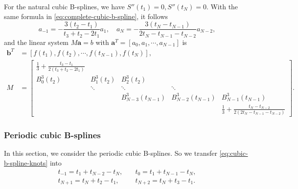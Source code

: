 \documentclass[a4paper]{article}
\theoremstyle{definition}
\begin{document}
For the natural cubic B-splines, we have $S''(t_1) = 0, S''(t_N) = 0$. With the same formula in \cref{eq:complete-cubic-b-spline}, it follows 
\begin{equation}
  a_{-1} = -\frac{3(t_2 - t_1)}{t_3 + t_2 - 2t_1} a_1,\quad a_N = -\frac{3(t_N - t_{N - 1})}{2t_N - t_{N - 1} - t_{N - 2}}a_{N - 2},
  \label{eq:natural-cubic-b-spline-coefficients}
\end{equation}
and the linear system $M\mathbf{a} = b$ with $\mathbf{a}^T = [a_0, a_1, \cdots, a_{N - 1}]$ is 
\begin{equation}
  \begin{aligned}
    \mathbf{b}^T &= [f(t_1), f(t_2), \cdots, f(t_{N - 1}), f(t_N)], \\
    M &= \begin{bmatrix}
      \frac{1}{3} + \frac{t_3 - t_1}{2(t_3 + t_2 - 2t_1)} &    &    &    &    \\
      B_0^3(t_2) & B_1^3(t_2) & B_2^3(t_2) &    &    \\
        & \ddots & \ddots & \ddots &    \\
        &    & B_{N - 3}^3(t_{N - 1}) & B_{N - 2}^3(t_{N - 1}) & B_{N - 1}^3(t_{N - 1}) \\
        &    &    &    & \frac{1}{3} + \frac{t_N - t_{N - 2}}{2(2t_N - t_{N - 1} - t_{N - 2})}
    \end{bmatrix}.
  \end{aligned}
  \label{eq:natural-cubic-b-spline-linear-system}
\end{equation}

\subsubsection{Periodic cubic B-splines}

In this section, we consider the periodic cubic B-splines. So we transfer \cref{eq:cubic-b-spline-knots} into 
\begin{equation}
  \begin{aligned}
    t_{-1} = t_1 + t_{N - 2} - t_N,\quad & t_0 = t_1 + t_{N - 1} - t_N, \\
    t_{N + 1} = t_N + t_2 - t_1,\quad & t_{N + 2} = t_N + t_3 - t_1.
  \end{aligned}
  \label{eq:periodic-cubic-b-spline-knots}
\end{equation}
\end{document}
